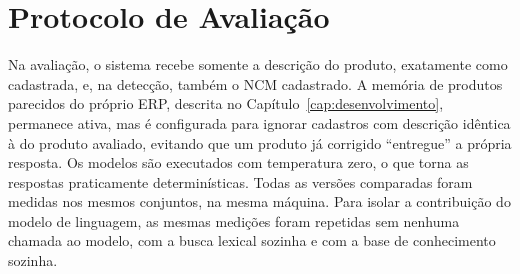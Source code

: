 \section{Protocolo de Avaliação}

Na avaliação, o sistema recebe somente a descrição do produto, exatamente como cadastrada, e, na detecção, também o NCM cadastrado. A memória de produtos parecidos do próprio ERP, descrita no Capítulo~\ref{cap:desenvolvimento}, permanece ativa, mas é configurada para ignorar cadastros com descrição idêntica à do produto avaliado, evitando que um produto já corrigido ``entregue'' a própria resposta. Os modelos são executados com temperatura zero, o que torna as respostas praticamente determinísticas. Todas as versões comparadas foram medidas nos mesmos conjuntos, na mesma máquina. Para isolar a contribuição do modelo de linguagem, as mesmas medições foram repetidas sem nenhuma chamada ao modelo, com a busca lexical sozinha e com a base de conhecimento sozinha.
